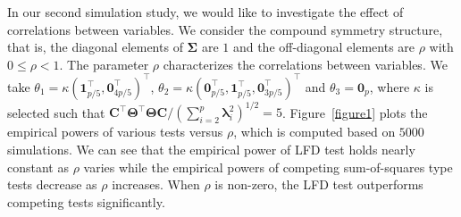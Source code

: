 \documentclass[12pt]{article} %
\DeclareMathOperator{\mytr}{tr}
\newcommand{\bC}{\mathbf{C}}
\newcommand{\bfsym}[1]{\ensuremath{\boldsymbol{#1}}}
\def\blambda {\bfsym {\lambda}}
\def\bSigma {\bfsym {\Sigma}}
\def\bTheta {\bfsym {\Theta}}
\theoremstyle{definition}
\begin{document}
In our second simulation study, we would like to investigate the effect of correlations between variables.
We consider the compound symmetry structure, that is, the diagonal elements of $\bSigma$ are $1$ and the off-diagonal elements are $\rho$ with $0\leq \rho<1$.
The parameter $\rho$ characterizes the correlations between variables.
We take 
$\theta_1=\kappa (\mathbf 1_{p/5}^\top,\mathbf{0}_{4p/5}^\top)^\top$, $\theta_2=\kappa (\mathbf{0}_{p/5}^\top, \mathbf 1_{p/5}^\top,\mathbf{0}_{3p/5}^\top)^\top$
and $\theta_3=\mathbf{0}_p$, where $\kappa$ is selected such that ${ \bC^\top \bTheta^\top \bTheta\bC}/(\sum_{i=2}^p\blambda_i^2)^{1/2}=5$.
Figure~\ref{figure1} plots the empirical powers of various tests versus $\rho$, which is computed based on $5000$ simulations.
We can see that the empirical power of LFD test holds nearly constant as $\rho$ varies while the empirical powers of competing sum-of-squares type tests decrease as $\rho$ increases.
When $\rho$ is non-zero, the LFD test outperforms competing tests significantly.


\end{document}
